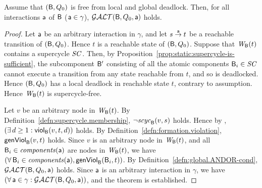 \begin{theorem}
\label{theorem:gao-is-complete}
Assume that $(\B,Q_0)$ is free from local and global deadlock. 
Then,  for all interactions $\act$ of $\B$ (\ie $\act \in \gamma$), 
$\GAO(\B,Q_0,\act)$ holds.
\end{theorem}
%
\begin{proof}
Let $\act$ be an arbitrary interaction in $\gamma$, and let 
$s \goesto[\act] t$ be a reachable transition of $(\B, Q_0)$.
Hence $t$ is a reachable state of $(\B,Q_0)$.
Suppose that $\wfg{\B}{t}$ contains a supercycle $\SC$. Then, by 
Proposition~\ref{prop:static:supercycle-is-sufficient}, the
subcomponent $\B'$ consisting of all the atomic components $\B_i \in \SC$
cannot execute a transition from any state reachable from $t$, and so is deadlocked.
Hence $(\B,Q_0)$ has a local deadlock in reachable state $t$, contrary to assumption.
Hence $\wfg{\B}{t}$ is supercycle-free.

Let $v$ be an arbitrary node in $\wfg{\B}{t}$.
By Definition~\ref{defn:supercycle.membership}, $\neg \scyc{\B}{s}{v}$ holds.
Hence by , $(\ex d \ge 1: \viol{v}{d}{t})$ holds.
By Definition~\ref{defn:formation.violation},  $\genViol{v}{t}$ holds.
Since $v$ is an arbitrary node in $\wfg{\B}{t}$, and all $\B_i \in \comps{\act}$ are nodes in 
$\wfg{\B}{t}$, we have $(\fas \B_i \in \comps{\act}, \formViol{\B_i}{t})$.
By Definition~\ref{defn:global.ANDOR-cond}, $\GAO(\B, Q_0, \act)$ holds.
Since $\act$ is an arbitrary interaction in $\gamma$, we have
$(\fas \act \in \gamma: \GAO(\B,Q_0,\act))$, and the theorem is established.
\end{proof}